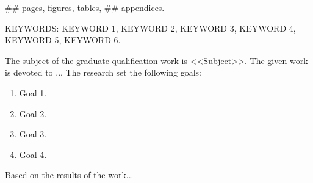 \documentclass[../main.tex]{subfiles}
\begin{document}
	\thispagestyle{empty}
	
	## pages,  figures,  tables, ## appendices.
	
	KEYWORDS: KEYWORD 1, KEYWORD 2, KEYWORD 3, KEYWORD 4, KEYWORD 5, KEYWORD 6.
	
	The subject of the graduate qualification work is <<Subject>>. The given work is devoted to ... 
    The research set the following goals:
	\begin{enumerate}
		\item Goal 1.
		\item Goal 2.
		\item Goal 3.
		\item Goal 4.
	\end{enumerate}
	
	Based on the results of the work...
	
	\thispagestyle{empty}
	
\end{document}
